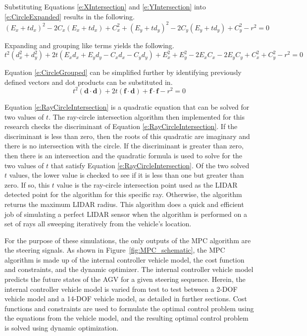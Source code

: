 \documentclass[12pt,onecolumn]{report}
\begin{document}
Substituting Equations \ref{e:XIntersection} and \ref{e:YIntersection} into \ref{e:CircleExpanded} results in the following.
%
\begin{equation}\label{e:CircleSubst}
\left(E_{x} + td_{x}\right)^2 - 2C_{x}\left(E_{x} + td_{x}\right) + C_{x}^{2} + \left(E_{y} + td_{y}\right)^2 - 2C_{y}\left(E_{y} + td_{y}\right)+ C_{y}^{2} - r^2 = 0
\end{equation}

Expanding and grouping like terms yields the following.
%
\begin{equation}\label{e:CircleGrouped}
t^{2}\left(d_{x}^{2} + d_{y}^{2}\right) + 2t\left(E_{x}d_{x} + E_{y}d_{y} - C_{x}d_{x} - C_{y}d_{y}\right) + E_{x}^{2} + E_{y}^{2} - 2 E_{x}C_{x} - 2 E_{y}C_{y} + C_{x}^{2} + C_{y}^{2} - r^{2} = 0
\end{equation}

Equation \ref{e:CircleGrouped} can be simplified further by identifying previously defined vectors and dot products can be substituted in.
%
\begin{equation}\label{e:RayCircleIntersection}
t^{2}\left(\boldsymbol{d}\cdot\boldsymbol{d}\right) + 2t\left(\boldsymbol{f}\cdot\boldsymbol{d}\right) +\boldsymbol{f}\cdot\boldsymbol{f} - r^{2} = 0
\end{equation}

Equation \ref{e:RayCircleIntersection} is a quadratic equation that can be solved for two values of $t$. The ray-circle intersection algorithm then implemented for this research checks the discriminant of Equation \ref{e:RayCircleIntersection}. If the discriminant is less than zero, then the roots of this quadratic are imaginary and there is no intersection with the circle. If the discriminant is greater than zero, then there is an intersection and the quadratic formula is used to solve for the two values of $t$ that satisfy Equation \ref{e:RayCircleIntersection}. Of the two solved $t$ values, the lower value is checked to see if it is less than one but greater than zero. If so, this $t$ value is the ray-circle intersection point used as the LIDAR detected point for the algorithm for this specific ray. Otherwise, the algorithm returns the maximum LIDAR radius. This algorithm does a quick and efficient job of simulating a perfect LIDAR sensor when the algorithm is performed on a set of rays all sweeping iteratively from the vehicle's location.

For the purpose of these simulations, the only outputs of the MPC algorithm are the steering signals. As shown in Figure~\ref{fig:MPC_schematic}, the MPC algorithm is made up of the internal controller vehicle model, the cost function and constraints, and the dynamic optimizer. The internal controller vehicle model predicts the future states of the AGV for a given steering sequence. Herein, the internal controller vehicle model is varied from test to test between a 2-DOF vehicle model and a 14-DOF vehicle model, as detailed in further sections. Cost functions and constraints are used to formulate the optimal control problem using the equations from the vehicle model, and the resulting optimal control problem is solved using dynamic optimization.
\end{document}
